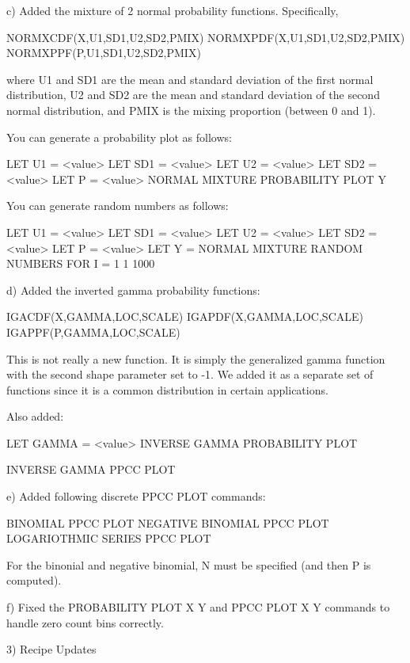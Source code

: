 {    c) Added the mixture of 2 normal probability functions.
       Specifically,

         NORMXCDF(X,U1,SD1,U2,SD2,PMIX)
         NORMXPDF(X,U1,SD1,U2,SD2,PMIX)
         NORMXPPF(P,U1,SD1,U2,SD2,PMIX)
   
       where U1 and SD1 are the mean and standard deviation of the
       first normal distribution, U2 and SD2 are the mean and standard
       deviation of the second normal distribution, and PMIX is
       the mixing proportion (between 0 and 1).
   
       You can generate a probability plot as follows:
   
         LET U1 = <value>
         LET SD1 = <value>
         LET U2 = <value>
         LET SD2 = <value>
         LET P = <value>
         NORMAL MIXTURE PROBABILITY PLOT Y
   
       You can generate random numbers as follows:
   
         LET U1 = <value>
         LET SD1 = <value>
         LET U2 = <value>
         LET SD2 = <value>
         LET P = <value>
         LET Y = NORMAL MIXTURE RANDOM NUMBERS FOR I = 1 1 1000

    d) Added the inverted gamma probability functions:

         IGACDF(X,GAMMA,LOC,SCALE)
         IGAPDF(X,GAMMA,LOC,SCALE)
         IGAPPF(P,GAMMA,LOC,SCALE)
   
       This is not really a new function.  It is simply the
       generalized gamma function with the second shape parameter
       set to -1.  We added it as a separate set of functions since
       it is a common distribution in certain applications.
   
       Also added:
   
          LET GAMMA = <value>
          INVERSE GAMMA PROBABILITY PLOT
   
          INVERSE GAMMA PPCC PLOT

    e) Added following discrete PPCC PLOT commands:
   
           BINOMIAL PPCC PLOT
           NEGATIVE BINOMIAL PPCC PLOT
           LOGARIOTHMIC SERIES PPCC PLOT
   
       For the binonial and negative binomial, N must be specified
       (and then P is computed).
   
    f) Fixed the PROBABILITY PLOT X Y and PPCC PLOT X Y commands
       to handle zero count bins correctly.

 3) Recipe Updates

}
